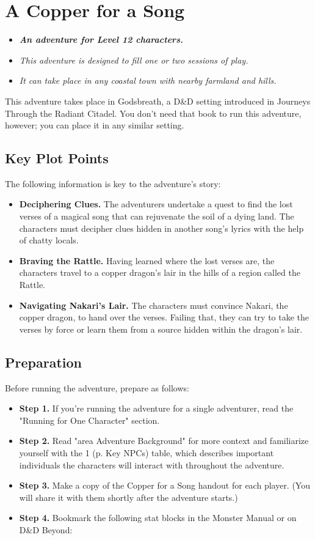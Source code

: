 \documentclass[letterpaper, 11pt, twocolumn]{dndbook}
\begin{document}
\chapter{A Copper for a Song}\label{ch:a-copper-for-a-song-2-2}

\begin{itemize}
\item \textit{ \textbf{An adventure for Level 12 characters.}}
\item \textit{This adventure is designed to fill one or two sessions of play.}
\item \textit{It can take place in any coastal town with nearby farmland and hills.}
\end{itemize}
This adventure takes place in Godsbreath, a D\&D setting introduced in Journeys Through the Radiant Citadel. You don't need that book to run this adventure, however; you can place it in any similar setting.
\section{Key Plot Points}

The following information is key to the adventure's story:

\begin{itemize}
\item \textbf{Deciphering Clues.} The adventurers undertake a quest to find the lost verses of a magical song that can rejuvenate the soil of a dying land. The characters must decipher clues hidden in another song's lyrics with the help of chatty locals.
\item \textbf{Braving the Rattle.} Having learned where the lost verses are, the characters travel to a copper dragon's lair in the hills of a region called the Rattle.
\item \textbf{Navigating Nakari's Lair.} The characters must convince Nakari, the copper dragon, to hand over the verses. Failing that, they can try to take the verses by force or learn them from a source hidden within the dragon's lair.
\end{itemize}
\section{Preparation}

Before running the adventure, prepare as follows:

\begin{itemize}
\item \textbf{Step 1.} If you're running the adventure for a single adventurer, read the "Running for One Character" section.
\item \textbf{Step 2.} Read "area Adventure Background" for more context and familiarize yourself with the 1 (p. Key NPCs) table, which describes important individuals the characters will interact with throughout the adventure.
\item \textbf{Step 3.} Make a copy of the Copper for a Song handout for each player. (You will share it with them shortly after the adventure starts.)
\item \textbf{Step 4.} Bookmark the following stat blocks in the Monster Manual or on D\&D Beyond:
\end{itemize}
\end{document}
